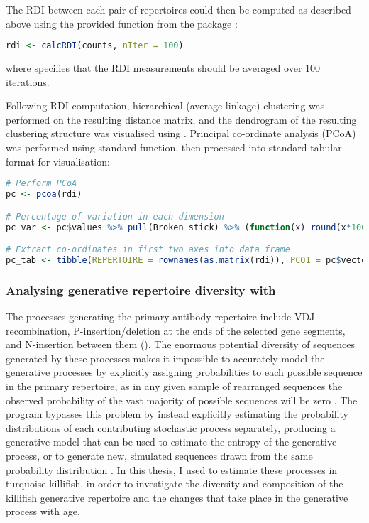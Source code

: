 \noindent The RDI between each pair of repertoires could then be computed as described above using the provided  function from the  package \parencite{bolen2017rdi}:

\begin{lstlisting}[language=R]
rdi <- calcRDI(counts, nIter = 100)
\end{lstlisting}

\noindent where  specifies that the RDI measurements should be averaged over 100 iterations.

Following RDI computation, hierarchical (average-linkage) clustering was performed on the resulting distance matrix, and the dendrogram of the resulting clustering structure was visualised using . Principal co-ordinate analysis (PCoA) was performed using standard   function, then processed into standard tabular format for visualisation:

\begin{lstlisting}[language=R]
# Perform PCoA
pc <- pcoa(rdi)

# Percentage of variation in each dimension
pc_var <- pc$values %>% pull(Broken_stick) %>% (function(x) round(x*100, 1))

# Extract co-ordinates in first two axes into data frame
pc_tab <- tibble(REPERTOIRE = rownames(as.matrix(rdi)), PCO1 = pc$vectors[,1], PCO2 = pc$vectors[,2])
\end{lstlisting}

\subsubsection{Analysing generative repertoire diversity with }
\label{sec:methods_comp_igdownstream_igor}

The processes generating the primary antibody repertoire include VDJ recombination, P-insertion/deletion at the ends of the selected gene segments, and N-insertion between them (). The enormous potential diversity of sequences generated by these processes makes it impossible to accurately model the generative processes by explicitly assigning probabilities to each possible sequence in the primary repertoire, as in any given sample of rearranged sequences the observed probability of the vast majority of possible sequences will be zero \parencite{marcou2018igor}. The program  bypasses this problem by instead explicitly estimating the probability distributions of each contributing stochastic process separately, producing a generative model that can be used to estimate the entropy of the generative process, or to generate new, simulated sequences drawn from the same probability distribution \parencite{marcou2018igor}. In this thesis, I used  to estimate these processes in turquoise killifish, in order to investigate the diversity and composition of the killifish generative repertoire and the changes that take place in the generative process with age.

